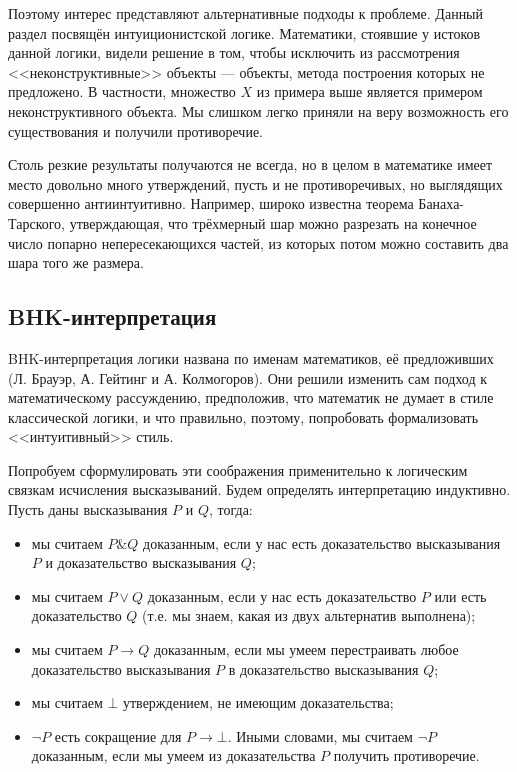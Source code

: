 Поэтому интерес представляют альтернативные подходы к проблеме. Данный раздел посвящён 
интуиционистской логике. Математики, стоявшие у истоков данной логики, видели решение в том,
чтобы исключить из рассмотрения <<неконструктивные>> объекты --- объекты, метода построения
которых не предложено. В частности, множество $X$ из примера выше является примером 
неконструктивного объекта. Мы слишком легко приняли на веру возможность его существования и
получили противоречие.

Столь резкие результаты получаются не всегда, но в целом в математике имеет место 
довольно много утверждений, пусть и не противоречивых, но выглядящих совершенно антиинтуитивно.
Например, широко известна теорема Банаха-Тарского, утверждающая, что трёхмерный шар можно 
разрезать на конечное число попарно непересекающихся частей, из которых потом можно составить
два шара того же размера.

\subsection*{BHK-интерпретация}

BHK-интерпретация логики названа по именам математиков, её предложивших 
(Л. Брауэр, А. Гейтинг и А. Колмогоров). 
Они решили изменить сам подход к математическому рассуждению, предположив,
что математик не думает в стиле классической логики, и что 
правильно, поэтому, попробовать формализовать <<интуитивный>> стиль.

Попробуем сформулировать эти соображения применительно к 
логическим связкам исчисления высказываний. Будем определять интерпретацию индуктивно. 
Пусть даны высказывания $P$ и $Q$, тогда:

\begin{itemize}
\item мы считаем $P \& Q$ доказанным, если у нас есть доказательство 
высказывания $P$ и доказательство высказывания $Q$;
\item мы считаем $P \vee Q$ доказанным, если у нас есть доказательство $P$ или 
есть доказательство $Q$ (т.е. мы знаем, какая из двух альтернатив выполнена);
\item мы считаем $P \rightarrow Q$ доказанным, если мы умеем перестраивать любое 
доказательство высказывания $P$ в доказательство высказывания $Q$;
\item мы считаем $\bot$ утверждением, не имеющим доказательства;
\item $\neg P$ есть сокращение для $P \rightarrow \bot$. Иными словами, мы считаем 
$\neg P$ доказанным, если мы умеем из доказательства $P$ получить противоречие.
\end{itemize}

